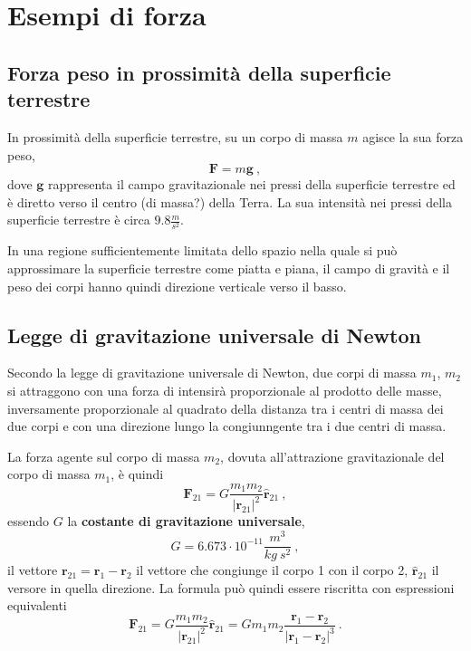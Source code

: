 \section{Esempi di forza}
\subsection{Forza peso in prossimità della superficie terrestre}
In prossimità della superficie terrestre, su un corpo di massa $m$ agisce la sua forza peso,
\begin{equation}
    \mathbf{F} = m \mathbf{g} \ ,
\end{equation}
dove $\mathbf{g}$ rappresenta il campo gravitazionale nei pressi della superficie terrestre ed è diretto verso il centro {\color{red} (di massa?)} della Terra. La sua intensità nei pressi della superficie terrestre è circa $9.8 \frac{m}{s^2}$.

In una regione sufficientemente limitata dello spazio nella quale si può approssimare la superficie terrestre come piatta e piana, il campo di gravità e il peso dei corpi hanno quindi direzione verticale verso il basso.

\subsection{Legge di gravitazione universale di Newton}
Secondo la legge di gravitazione universale di Newton, due corpi di massa $m_1$, $m_2$ si attraggono con una forza di intensirà proporzionale al prodotto delle masse, inversamente proporzionale al quadrato della distanza tra i centri di massa dei due corpi e con una direzione lungo la congiunngente tra i due centri di massa.

La forza agente sul corpo di massa $m_2$, dovuta all'attrazione gravitazionale del corpo di massa $m_1$, è quindi
\begin{equation}
    \mathbf{F}_{21} = G \dfrac{m_1 m_2}{|\mathbf{r}_{21}|^2} \mathbf{\hat{r}}_{21} \ ,
\end{equation}
essendo $G$ la \textbf{costante di gravitazione universale},
\begin{equation}
    G = 6.673 \cdot 10^{-11} \dfrac{m^3}{kg \ s^2} \ ,
\end{equation}
il vettore $\mathbf{r}_{21} = \mathbf{r}_1 - \mathbf{r}_2$ il vettore che congiunge il corpo 1 con il corpo 2, $\mathbf{\hat{r}}_{21}$ il versore in quella direzione. La formula può quindi essere riscritta con espressioni equivalenti
\begin{equation}
    \mathbf{F}_{21} = G \dfrac{m_1 m_2}{|\mathbf{r}_{21}|^2} \mathbf{\hat{r}}_{21} = 
    G m_1 m_2 \dfrac{\mathbf{r}_1 - \mathbf{r}_2}{|\mathbf{r}_1 - \mathbf{r}_2|^3} \ .
\end{equation}

